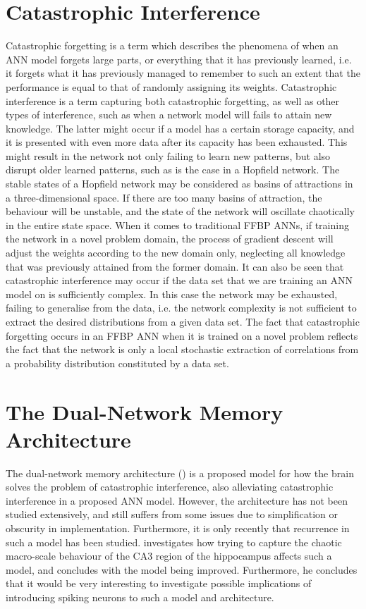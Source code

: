 \section{Catastrophic Interference}

Catastrophic forgetting \cite{McCloskey1989} is a term which describes the phenomena of when an ANN model forgets large parts, or everything that it has previously learned, i.e. it forgets what it has previously managed to remember to such an extent that the performance is equal to that of randomly assigning its weights. Catastrophic interference is a term capturing both catastrophic forgetting, as well as other types of interference, such as when a network model will fails to attain new knowledge. The latter might occur if a model has a certain storage capacity, and it is presented with even more data after its capacity has been exhausted. This might result in the network not only failing to learn new patterns, but also disrupt older learned patterns, such as is the case in a Hopfield network. The stable states of a Hopfield network may be considered as basins of attractions in a three-dimensional space. If there are too many basins of attraction, the behaviour will be unstable, and the state of the network will oscillate chaotically in the entire state space.
When it comes to traditional FFBP ANNs, if training the network in a novel problem domain, the process of gradient descent will adjust the weights according to the new domain only, neglecting all knowledge that was previously attained from the former domain.
It can also be seen that catastrophic interference may occur if the data set that we are training an ANN model on is sufficiently complex. In this case the network may be exhausted, failing to generalise from the data, i.e. the network complexity is not sufficient to extract the desired distributions from a given data set. 
The fact that catastrophic forgetting occurs in an FFBP ANN when it is trained on a novel problem reflects the fact that the network is only a local stochastic extraction of correlations from a probability distribution constituted by a data set.

\section{The Dual-Network Memory Architecture}

The dual-network memory architecture (\cite{McClelland1995}) is a proposed model for how the brain solves the problem of catastrophic interference, also alleviating catastrophic interference in a proposed ANN model. However, the architecture has not been studied extensively, and still suffers from some issues due to simplification or obscurity in implementation. Furthermore, it is only recently that recurrence in such a model has been studied. \cite{Hattori2014} investigates how trying to capture the chaotic macro-scale behaviour of the CA3 region of the hippocampus affects such a model, and concludes with the model being improved. Furthermore, he concludes that it would be very interesting to investigate possible implications of introducing spiking neurons to such a model and architecture.


